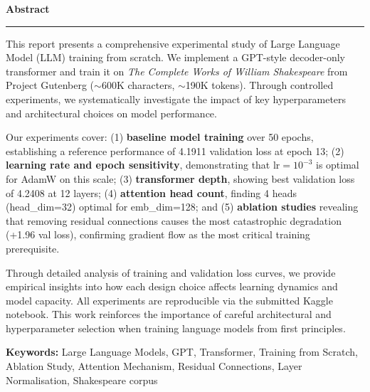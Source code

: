 \documentclass[12pt,a4paper]{article}
\begin{document}
\newpage
\thispagestyle{empty}
\begin{center}
  {\large\bfseries\color{black} Abstract}\\[8pt]
  {\color{navyblue}\rule{0.6\linewidth}{0.8pt}}
\end{center}
\vspace{6pt}

This report presents a comprehensive experimental study of Large Language Model (LLM) training from scratch. We implement a GPT-style decoder-only transformer and train it on \textit{The Complete Works of William Shakespeare} from Project Gutenberg ($\sim$600K characters, $\sim$190K tokens). Through controlled experiments, we systematically investigate the impact of key hyperparameters and architectural choices on model performance.

Our experiments cover: (1) \textbf{baseline model training} over 50 epochs, establishing a reference performance of 4.1911 validation loss at epoch 13; (2) \textbf{learning rate and epoch sensitivity}, demonstrating that lr$=10^{-3}$ is optimal for AdamW on this scale; (3) \textbf{transformer depth}, showing best validation loss of 4.2408 at 12 layers; (4) \textbf{attention head count}, finding 4 heads (head\_dim=32) optimal for emb\_dim=128; and (5) \textbf{ablation studies} revealing that removing residual connections causes the most catastrophic degradation (+1.96 val loss), confirming gradient flow as the most critical training prerequisite.

Through detailed analysis of training and validation loss curves, we provide empirical insights into how each design choice affects learning dynamics and model capacity. All experiments are reproducible via the submitted Kaggle notebook. This work reinforces the importance of careful architectural and hyperparameter selection when training language models from first principles.

\vspace{1cm}
\noindent\textbf{Keywords:} Large Language Models, GPT, Transformer, Training from Scratch, Ablation Study, Attention Mechanism, Residual Connections, Layer Normalisation, Shakespeare corpus

\newpage
\thispagestyle{empty}
\tableofcontents
\end{document}

